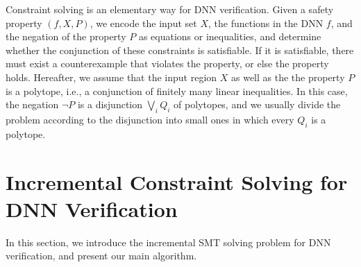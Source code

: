 \documentclass[runningheads]{llncs}
\begin{document}
Constraint solving is an elementary way for DNN verification. Given a safety property $(f,X,P)$, we encode the input set $X$, the functions in the DNN $f$, and the negation of the property $P$ as equations or inequalities, and determine whether the conjunction of these constraints is satisfiable. If it is satisfiable, there must exist a counterexample that violates the property, or else the property holds. Hereafter, we assume that the input region $X$ as well as the the property $P$ is a polytope, i.e., a conjunction of finitely many linear inequalities. In this case, the negation $\neg P$ is a disjunction $\bigvee_i Q_i$ of polytopes, and we usually divide the problem according to the disjunction into small ones in which every $Q_i$ is a polytope.


\section{Incremental Constraint Solving for DNN Verification}

In this section, we introduce the incremental SMT solving problem for DNN verification, and present our main algorithm.
\end{document}
